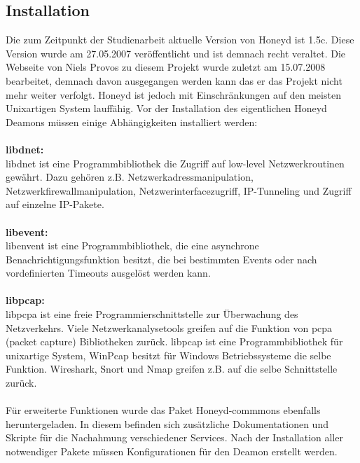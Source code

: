 \subsection{Installation}
Die zum Zeitpunkt der Studienarbeit aktuelle Version von Honeyd ist 1.5c. Diese Version wurde am 27.05.2007 veröffentlicht und ist demnach recht veraltet. Die Webseite von Niels Provos zu diesem Projekt wurde zuletzt am 15.07.2008 bearbeitet, demnach davon ausgegangen werden kann das er das Projekt nicht mehr weiter verfolgt. Honeyd ist jedoch mit Einschränkungen auf den meisten Unixartigen System lauffähig.
Vor der Installation des eigentlichen Honeyd Deamons müssen einige Abhängigkeiten installiert werden:\\
\\
\noindent\textbf{libdnet:}\\
libdnet ist eine Programmbibliothek die Zugriff auf low-level Netzwerkroutinen gewährt. Dazu gehören z.B. Netzwerkadressmanipulation, Netzwerkfirewallmanipulation, Netzwerinterfacezugriff, IP-Tunneling und Zugriff auf einzelne IP-Pakete.\\\\
\noindent\textbf{libevent:}\\
libenvent ist eine Programmbibliothek, die eine asynchrone Benachrichtigungsfunktion besitzt, die bei bestimmten Events oder nach vordefinierten Timeouts ausgelöst werden kann.\\\\
\noindent\textbf{libpcap:}\\
libpcpa ist eine freie Programmierschnittstelle zur Überwachung des Netzverkehrs. Viele Netzwerkanalysetools greifen auf die Funktion von pcpa (packet capture) Bibliotheken zurück. libpcap ist eine Programmbibliothek für unixartige System, WinPcap besitzt für Windows Betriebssysteme die selbe Funktion. Wireshark, Snort und Nmap greifen z.B. auf die selbe Schnittstelle zurück.\\
\\
Für erweiterte Funktionen wurde das Paket Honeyd-commmons ebenfalls heruntergeladen. In diesem befinden sich zusätzliche Dokumentationen und Skripte für die Nachahmung verschiedener Services. Nach der Installation aller notwendiger Pakete müssen Konfigurationen für den Deamon erstellt werden.